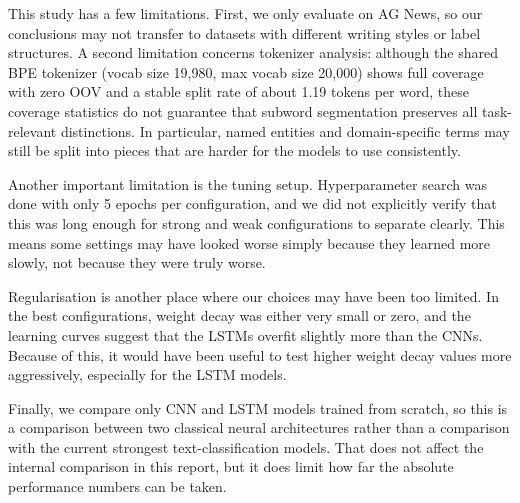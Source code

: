 This study has a few limitations. First, we only evaluate on AG News, so our conclusions may not transfer to datasets with different writing styles or label structures. A second limitation concerns tokenizer analysis: although the shared BPE tokenizer (vocab size 19{,}980, max vocab size 20{,}000) shows full coverage with zero OOV and a stable split rate of about 1.19 tokens per word, these coverage statistics do not guarantee that subword segmentation preserves all task-relevant distinctions. In particular, named entities and domain-specific terms may still be split into pieces that are harder for the models to use consistently.

Another important limitation is the tuning setup. Hyperparameter search was done with only 5 epochs per configuration, and we did not explicitly verify that this was long enough for strong and weak configurations to separate clearly. This means some settings may have looked worse simply because they learned more slowly, not because they were truly worse.

Regularisation is another place where our choices may have been too limited. In the best configurations, weight decay was either very small or zero, and the learning curves suggest that the LSTMs overfit slightly more than the CNNs. Because of this, it would have been useful to test higher weight decay values more aggressively, especially for the LSTM models.

Finally, we compare only CNN and LSTM models trained from scratch, so this is a comparison between two classical neural architectures rather than a comparison with the current strongest text-classification models. That does not affect the internal comparison in this report, but it does limit how far the absolute performance numbers can be taken.
